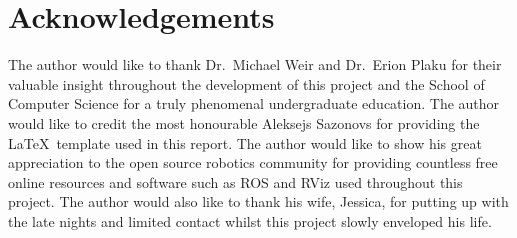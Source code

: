 


\chapter*{Acknowledgements}

\label{chapter:ack}

The author would like to thank Dr.\ Michael Weir and Dr.\ Erion Plaku for their
valuable insight throughout the development of this project and the School of
Computer Science for a truly phenomenal undergraduate education. The author
would like to credit the most honourable Aleksejs Sazonovs for providing the
\LaTeX \, template used in this report. The author would like to show his great
appreciation to the open source robotics community for providing countless free
online resources and software such as ROS and RViz used throughout this
project. The author would also like to thank his wife, Jessica, for putting up
with the late nights and limited contact whilst this project slowly enveloped
his life.


